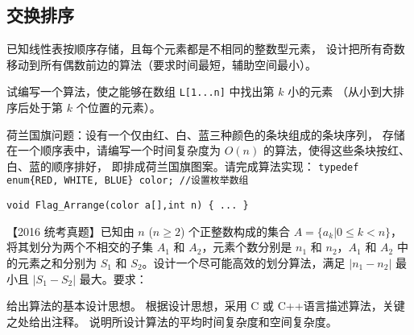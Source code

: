 \subsection{交换排序}

\begin{qitems}
    \begin{bbox}
        \qitem 已知线性表按顺序存储，且每个元素都是不相同的整数型元素，
        设计把所有奇数移动到所有偶数前边的算法（要求时间最短，辅助空间最小）。
    \end{bbox}
    \begin{bbox}
        \qitem 试编写一个算法，使之能够在数组 \lstinline{L[1...n]} 中找出第 $k$ 小的元素
        （从小到大排序后处于第 $k$ 个位置的元素）。
    \end{bbox}
    \begin{bbox}
        \qitem 荷兰国旗问题：设有一个仅由红、白、蓝三种颜色的条块组成的条块序列，
        存储在一个顺序表中，请编写一个时间复杂度为 $O(n)$ 的算法，使得这些条块按红、白、蓝的顺序排好，
        即排成荷兰国旗图案。请完成算法实现：
        \quad \lstinline|typedef enum{RED, WHITE, BLUE} color; //设置枚举数组|
        
        \quad \lstinline|void Flag_Arrange(color a[],int n) { ... }|
    \end{bbox}
    \begin{bbox}
        \qitem 【2016 统考真题】已知由 $n$ ($n \ge 2$) 个正整数构成的集合 $A=\{a_k | 0 \le k < n\}$，将其划分为两个不相交的子集 $A_1$ 和 $A_2$，元素个数分别是 $n_1$ 和 $n_2$，$A_1$ 和 $A_2$ 中的元素之和分别为 $S_1$ 和 $S_2$。设计一个尽可能高效的划分算法，满足 $|n_1-n_2|$ 最小且 $|S_1-S_2|$ 最大。要求：
        \begin{subqitems}
            \subqitem 给出算法的基本设计思想。
            \subqitem 根据设计思想，采用 C 或 C++语言描述算法，关键之处给出注释。
            \subqitem 说明所设计算法的平均时间复杂度和空间复杂度。
        \end{subqitems}
    \end{bbox}
\end{qitems} 